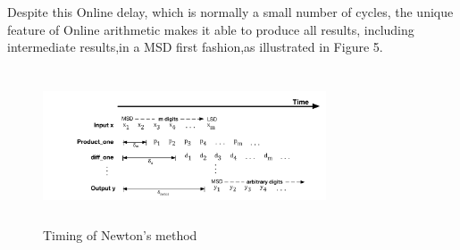 \documentclass{sig-alternate}
\begin{document}
Despite this Online delay, which is normally a small number of cycles, the unique feature of Online arithmetic makes it able to produce all results, including intermediate results,in a MSD first fashion,as illustrated in Figure 5. 
\vspace{-10pt}
\begin{figure} [ht]
	\centering
	\includegraphics[width=3.3in,height=1.8in]{newton_timing}
	\caption{Timing of Newton's method}
\end{figure}
\end{document}
